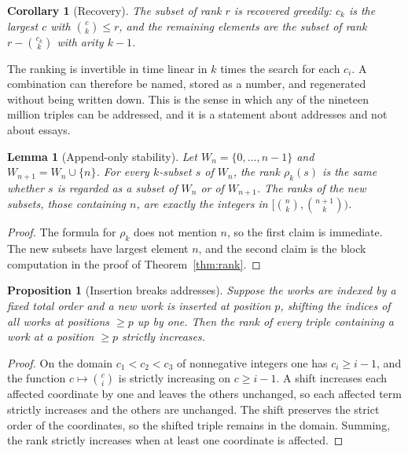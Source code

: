\documentclass[11pt]{article}
\theoremstyle{plain}
\newtheorem{lemma}[theorem]{Lemma}
\newtheorem{proposition}[theorem]{Proposition}
\newtheorem{corollary}[theorem]{Corollary}
\theoremstyle{definition}
\theoremstyle{remark}
\begin{document}
\begin{corollary}[Recovery]\label{cor:recover}
The subset of rank $r$ is recovered greedily: $c_k$ is the largest $c$ with $\binom{c}{k}\le r$, and the remaining elements are the subset of rank $r-\binom{c_k}{k}$ with arity $k-1$.
\end{corollary}

The ranking is invertible in time linear in $k$ times the search for each $c_i$. A combination can therefore be named, stored as a number, and regenerated without being written down. This is the sense in which any of the nineteen million triples can be addressed, and it is a statement about addresses and not about essays.

\begin{lemma}[Append-only stability]\label{lem:append}
Let $W_n=\{0,\ldots,n-1\}$ and $W_{n+1}=W_n\cup\{n\}$. For every $k$-subset $s$ of $W_n$, the rank $\rho_k(s)$ is the same whether $s$ is regarded as a subset of $W_n$ or of $W_{n+1}$. The ranks of the new subsets, those containing $n$, are exactly the integers in $[\binom{n}{k},\binom{n+1}{k})$.
\end{lemma}

\begin{proof}
The formula for $\rho_k$ does not mention $n$, so the first claim is immediate. The new subsets have largest element $n$, and the second claim is the block computation in the proof of Theorem~\ref{thm:rank}. \qedhere
\end{proof}

\begin{proposition}[Insertion breaks addresses]\label{prop:insert}
Suppose the works are indexed by a fixed total order and a new work is inserted at position $p$, shifting the indices of all works at positions $\ge p$ up by one. Then the rank of every triple containing a work at a position $\ge p$ strictly increases.
\end{proposition}

\begin{proof}
On the domain $c_1<c_2<c_3$ of nonnegative integers one has $c_i\ge i-1$, and the function $c\mapsto\binom{c}{i}$ is strictly increasing on $c\ge i-1$. A shift increases each affected coordinate by one and leaves the others unchanged, so each affected term strictly increases and the others are unchanged. The shift preserves the strict order of the coordinates, so the shifted triple remains in the domain. Summing, the rank strictly increases when at least one coordinate is affected. \qedhere
\end{proof}
\end{document}
